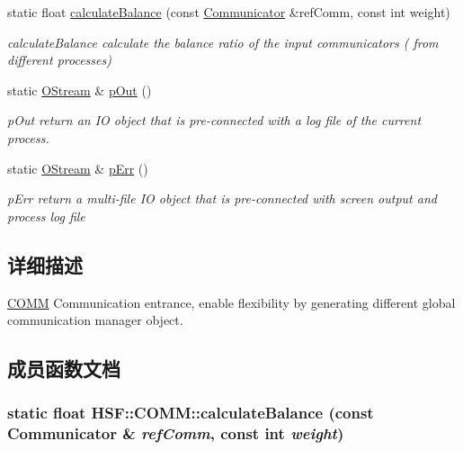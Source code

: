 \begin{DoxyCompactItemize}
\item 
static float \hyperlink{classHSF_1_1COMM_aab59c2848eee97f010d9b50c3d3881b4}{calculateBalance} (const \hyperlink{classHSF_1_1Communicator}{Communicator} \&refComm, const int weight)
\begin{DoxyCompactList}\small\item\em calculateBalance calculate the balance ratio of the input communicators ( from different processes) \item\end{DoxyCompactList}\item 
static \hyperlink{classHSF_1_1OStream}{OStream} \& \hyperlink{classHSF_1_1COMM_a34972039314a2f48f084316f6c2a02bb}{pOut} ()
\begin{DoxyCompactList}\small\item\em pOut return an IO object that is pre-\/connected with a log file of the current process. \item\end{DoxyCompactList}\item 
static \hyperlink{classHSF_1_1OStream}{OStream} \& \hyperlink{classHSF_1_1COMM_ad3b168a9b2f1a465334f5c161d8fb67b}{pErr} ()
\begin{DoxyCompactList}\small\item\em pErr return a multi-\/file IO object that is pre-\/connected with screen output and process log file \item\end{DoxyCompactList}\end{DoxyCompactItemize}


\subsection{详细描述}
\hyperlink{classHSF_1_1COMM}{COMM} Communication entrance, enable flexibility by generating different global communication manager object. 

\subsection{成员函数文档}
\hypertarget{classHSF_1_1COMM_aab59c2848eee97f010d9b50c3d3881b4}{
\subsubsection[{calculateBalance}]{\setlength{\rightskip}{0pt plus 5cm}static float HSF::COMM::calculateBalance (const {\bf Communicator} \& {\em refComm}, \/  const int {\em weight})}}
\label{classHSF_1_1COMM_aab59c2848eee97f010d9b50c3d3881b4}


